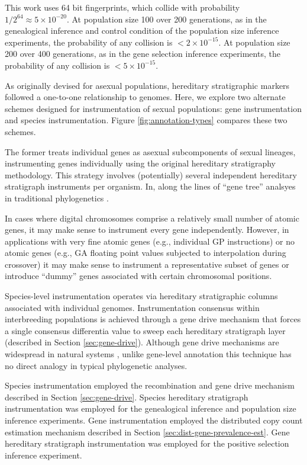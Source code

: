 This work uses 64 bit fingerprints, which collide with probability $1/2^{64} \approx 5 \times 10^{-20}$.
At population size 100 over 200 generations, as in the genealogical inference and control condition of the population size inference experiments, the probability of any collision is $< 2 \times 10^{-15}$.
At population size 200 over 400 generations, as in the gene selection inference experiments, the probability of any collision is $< 5 \times 10^{-15}$.



As originally devised for asexual populations, hereditary stratigraphic markers followed a one-to-one relationship to genomes.
Here, we explore two alternate schemes designed for instrumentation of sexual populations: gene instrumentation and species instrumentation.
Figure \ref{fig:annotation-types} compares these two schemes.

The former treats individual genes as asexual subcomponents of sexual lineages, instrumenting genes individually using the original hereditary stratigraphy methodology.
This strategy involves (potentially) several independent hereditary stratigraph instruments per organism.
In, along the lines of ``gene tree'' analsyes in traditional phylogenetics \citep{avise1989gene}.

In cases where digital chromosomes comprise a relatively small number of atomic genes, it may make sense to instrument every gene independently.
However, in applications with very fine atomic genes (e.g., individual GP instructions) or no atomic genes (e.g., GA floating point values subjected to interpolation during crossover) it may make sense to instrument a representative subset of genes or introduce ``dummy'' genes associated with certain chromosomal positions.

Species-level instrumentation operates via hereditary stratigraphic columns associated with individual genomes.
Instrumentation consensus within interbreeding populations is achieved through a gene drive mechanism that forces a single consensus differentia value to sweep each hereditary stratigraph layer (described in Section \ref{sec:gene-drive}).
Although gene drive mechanisms are widespread in natural systems \citep{alphey2020standardizing, price2020resistance}, unlike gene-level annotation this technique has no direct analogy in typical phylogenetic analyses.

Species instrumentation employed the recombination and gene drive mechanism described in Section \ref{sec:gene-drive}.
Species hereditary stratigraph instrumentation was employed for the genealogical inference and population size inference experiments.
Gene instrumentation employed the distributed copy count estimation mechanism described in Section \ref{sec:dist-gene-prevalence-est}.
Gene hereditary stratigraph instrumentation was employed for the positive selection inference experiment.

